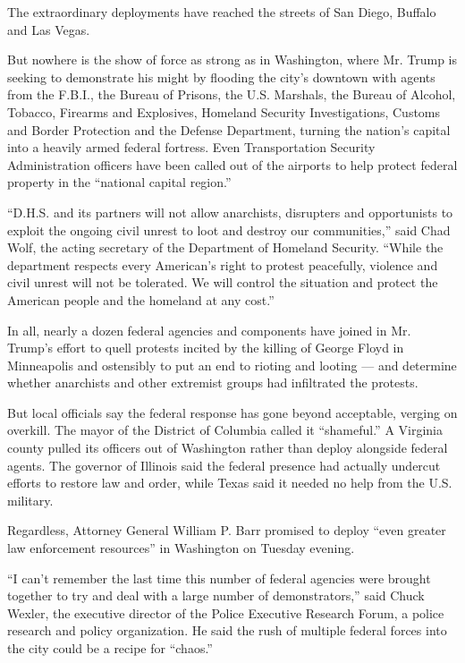 The extraordinary deployments have reached the streets of San Diego,
Buffalo and Las Vegas.

But nowhere is the show of force as strong as in Washington, where Mr.
Trump is seeking to demonstrate his might by flooding the city's
downtown with agents from the F.B.I., the Bureau of Prisons, the U.S.
Marshals, the Bureau of Alcohol, Tobacco, Firearms and Explosives,
Homeland Security Investigations, Customs and Border Protection and the
Defense Department, turning the nation's capital into a heavily armed
federal fortress. Even Transportation Security Administration officers
have been called out of the airports to help protect federal property in
the ``national capital region.''

``D.H.S. and its partners will not allow anarchists, disrupters and
opportunists to exploit the ongoing civil unrest to loot and destroy our
communities,'' said Chad Wolf, the acting secretary of the Department of
Homeland Security. ``While the department respects every American's
right to protest peacefully, violence and civil unrest will not be
tolerated. We will control the situation and protect the American people
and the homeland at any cost.''

In all, nearly a dozen federal agencies and components have joined in
Mr. Trump's effort to quell protests incited by the killing of George
Floyd in Minneapolis and ostensibly to put an end to rioting and looting
--- and determine whether anarchists and other extremist groups had
infiltrated the protests.

But local officials say the federal response has gone beyond acceptable,
verging on overkill. The mayor of the District of Columbia called it
``shameful.'' A Virginia county pulled its officers out of Washington
rather than deploy alongside federal agents. The governor of Illinois
said the federal presence had actually undercut efforts to restore law
and order, while Texas said it needed no help from the U.S. military.

Regardless, Attorney General William P. Barr promised to deploy ``even
greater law enforcement resources'' in Washington on Tuesday evening.

``I can't remember the last time this number of federal agencies were
brought together to try and deal with a large number of demonstrators,''
said Chuck Wexler, the executive director of the Police Executive
Research Forum, a police research and policy organization. He said the
rush of multiple federal forces into the city could be a recipe for
``chaos.''

